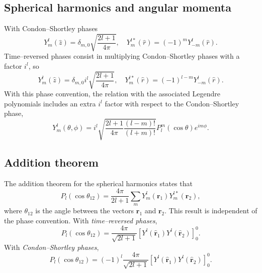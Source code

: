  
 \begin{subappendices}
\section{Spherical harmonics and angular momenta}\label{C7AppD}
With Condon--Shortley phases
\begin{equation}\label{eq20}
Y_m^l(\hat z)=\delta_{m,0} \sqrt{\frac{2l+1}{4 \pi}}, \quad Y_m^{l*}(\hat r)=(-1)^m Y_{-m}^l(\hat r).
\end{equation}
Time--reversed phases consist in multiplying Condon--Shortley phases with a factor $i^l$, so
\begin{equation}\label{eq21}
Y_m^l(\hat z)=\delta_{m,0} i^l \sqrt{\frac{2l+1}{4 \pi}}, \quad Y_m^{l*}(\hat r)=(-1)^{l-m} Y_{-m}^l(\hat r).
\end{equation}
With this phase convention, the relation with the associated Legendre polynomials includes an extra $i^l$ factor with respect to the Condon--Shortley phase,
\begin{equation}\label{eq120}
Y_m^l(\theta,\phi)=i^l \sqrt{\frac{2l+1}{4\pi}\frac{(l-m)!}{(l+m)!}}P_l^m(\cos \theta)e^{im\phi}.
\end{equation}
\subsection{Addition theorem}
The addition theorem for the spherical harmonics states that
\begin{equation}\label{eq129}
P_l(\cos \theta_{12})=\frac{4\pi}{2l+1}\sum_m Y_m^l(\mathbf{r}_1)Y_m^{l*}(\mathbf{r}_2),
\end{equation}
where $\theta_{12}$ is the angle between the vectors $\mathbf{r}_1$ and $\mathbf{r}_2$. This result is independent of the phase convention. With \emph{time--reversed phases},
\begin{equation}\label{eq130}
P_l(\cos \theta_{12})=\frac{4\pi}{\sqrt{2l+1}}\left[ Y^{l}(\hat {\mathbf{r}}_1)Y^{l}(\hat {\mathbf{r}}_2) \right]^{0}_{0}.
\end{equation}
With \emph{Condon--Shortley phases},
\begin{equation}\label{eq131}
P_l(\cos \theta_{12})=(-1)^l\frac{4\pi}{\sqrt{2l+1}}\left[ Y^{l}(\hat {\mathbf{r}}_1)Y^{l}(\hat {\mathbf{r}}_2) \right]^{0}_{0}.
\end{equation}

\end{subappendices}
